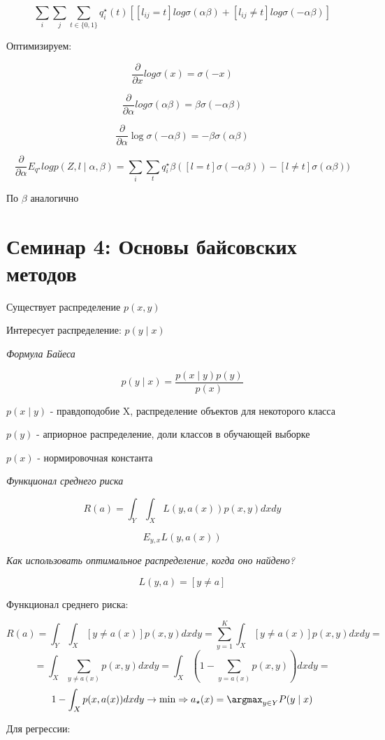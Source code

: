 \documentclass[a4paper, 12pt]{article}
\begin{document}
\[\sum_i \sum_j \sum_{t \in \{0, 1\}} 
q_i^{\star}(t)[[l_{ij} = t] log \sigma(\alpha\beta) + 
[l_{ij} \neq t] log \sigma(-\alpha\beta)]\]

Оптимизируем:

\[\frac{\partial}{\partial x} log\sigma(x) = \sigma(-x)\]

\[\frac{\partial}{\partial \alpha}
log\sigma(\alpha\beta)= 
\beta\sigma(-\alpha\beta)\]

\[\frac{\partial}{\partial \alpha} \log\sigma(-\alpha\beta) = 
-\beta\sigma(\alpha\beta)\]

\[\frac{\partial}{\partial \alpha} E_{q^{\star}} 
log p(Z, l \mid \alpha, \beta) = 
\sum_i \sum_t q_i^{\star} \beta ([l = t]\sigma(-\alpha\beta)) - 
[l \neq t]\sigma(\alpha\beta))\]

По $\beta$ аналогично

\section{Семинар 4: Основы байсовских методов}

Существует распределение $p(x, y)$

Интересует распределение: $p(y \mid x)$

\textit{Формула Байеса}

\[p(y \mid x) = \frac{p(x \mid y)p(y)}{p(x)}\]

$p(x \mid y)$ - правдоподобие X, распределение объектов
для некоторого класса

$p(y)$ - априорное распределение, 
доли классов в обучающей выборке

$p(x)$ - нормировочная константа

\textit{Функционал среднего риска}

\[R(a) = \int_Y \int_X L(y, a(x))p(x, y)dxdy\]

\[E_{y, x}L(y, a(x))\]

\textit{Как использовать оптимальное распределение, 
когда оно найдено?}

\[L(y, a) = [y \neq a]\]

Функционал среднего риска:

\[R(a) = \int_Y \int_X [y \neq a(x)]p(x, y)dxdy 
= \sum_{y = 1}^{K}\int_X[y \neq a(x)]p(x, y)dxdy =\]
\[= \int_X \sum_{y \neq a(x)}p(x, y)dxdy 
= \int_X (1 - \sum_{y = a(x)}p(x, y))dxdy =\]
\[1 - \int_X p(x, a(x))dxdy \rightarrow \min \Rightarrow
a_{\star}(x) = \argmax_{y \in Y} P(y \mid x)\]

Для регрессии:
\end{document}
